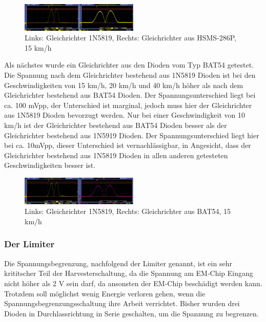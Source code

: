 \begin{figure}[ht]
    \includegraphics[width=0.5\textwidth]{3Vorgehen/imag/Messung_Optimierung_Gleichrichter_1.png}
    \caption{Links: Gleichrichter 1N5819, Rechts: Gleichrichter aus HSMS-286P, 15 km/h}
    \label{messung_optimierung_gleichrichter_1} 
\end{figure}

Als nächstes wurde ein Gleichrichter aus den Dioden vom Typ BAT54 getestet. Die Spannung nach dem Gleichrichter bestehend aus 1N5819 Dioden ist bei den Geschwindigkeiten von 15 km/h, 20 km/h und 40 km/h höher als nach dem Gleichrichter bestehend aus BAT54 Dioden. Der Spannungsunterschied liegt bei ca. 100 mVpp, der Unterschied ist marginal, jedoch muss hier der Gleichrichter aus 1N5819 Dioden bevorzugt werden. Nur bei einer Geschwindigkeit von 10 km/h ist der Gleichrichter bestehend aus BAT54 Dioden besser als der Gleichrichter bestehend aus 1N5919 Dioden. Der Spannungsunterschied liegt hier bei ca. 10mVpp, dieser Unterschied ist vernachlässigbar, in Angesicht, dass der Gleichrichter bestehend aus 1N5819 Dioden in allen anderen getesteten Geschwindigkeiten besser ist.

\begin{figure}[ht]
    \includegraphics[width=0.5\textwidth]{3Vorgehen/imag/Messung_Optimierung_Gleichrichter_2.png}
    \caption{Links: Gleichrichter 1N5819, Rechts: Gleichrichter aus BAT54, 15 km/h}
    \label{messung_optimierung_gleichrichter_2} 
\end{figure}

\subsubsection{Der Limiter}

Die Spannungsbegrenzung, nachfolgend der Limiter genannt, ist ein sehr krititscher Teil der Harvesterschaltung, da die Spannung am EM-Chip Eingang nicht höher als 2 V sein darf, da ansonsten der EM-Chip beschädigt werden kann. Trotzdem soll möglichst wenig Energie verloren gehen, wenn die Spannungsbegrenzungsschaltung ihre Arbeit verrichtet. Bisher wurden drei Dioden in Durchlassrichtung in Serie geschalten, um die Spannung zu begrenzen.

